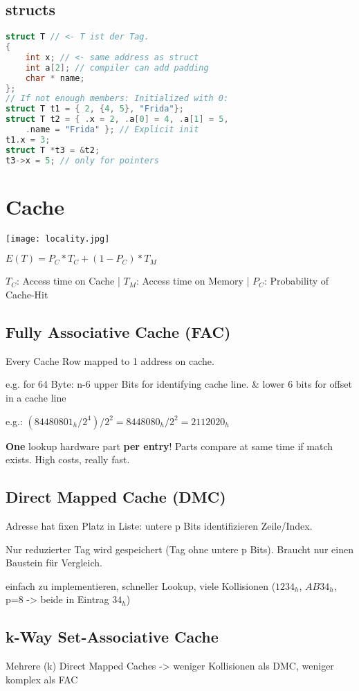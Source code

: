 \begin{multicols*}{4}
\subsection{structs}
\begin{lstlisting}[language=c]
struct T // <- T ist der Tag.
{
    int x; // <- same address as struct
    int a[2]; // compiler can add padding
    char * name;
};
// If not enough members: Initialized with 0:
struct T t1 = { 2, {4, 5}, "Frida"};
struct T t2 = { .x = 2, .a[0] = 4, .a[1] = 5,
    .name = "Frida" }; // Explicit init
t1.x = 3;
struct T *t3 = &t2;
t3->x = 5; // only for pointers
\end{lstlisting}

\section{Cache}
\texttt{[image: locality.jpg]}

\(E(T) = P_C * T_C + (1 - P_C )* T_M\)

\(T_C\): Access time on Cache |
\(T_M\): Access time on Memory |
\(P_C\): Probability of Cache-Hit

\subsection{Fully Associative Cache (FAC)}
Every Cache Row mapped to 1 address on cache.

e.g. for 64 Byte: n-6 upper Bits for identifying cache line. \& lower 6 bits for offset in a cache line

e.g.: \((84480801_h / 2^4) / 2^2 = 8448080_h / 2^2 = 2112020_h\)

\textbf{One} lookup hardware part \textbf{per entry}! Parts compare at same time if match exists. High costs, really fast.

\subsection{Direct Mapped Cache (DMC)}

Adresse hat fixen Platz in Liste: untere p Bits identifizieren Zeile/Index.

Nur reduzierter Tag wird gespeichert (Tag ohne untere p Bits). Braucht nur einen Baustein für Vergleich.

einfach zu implementieren, schneller Lookup, viele Kollisionen (\(1234_h\), \(AB34_h\), p=8 -> beide in Eintrag \(34_h\))


\subsection{k-Way Set-Associative Cache}
Mehrere (k) Direct Mapped Caches -> weniger Kollisionen als DMC, weniger komplex als FAC


\end{multicols*}

